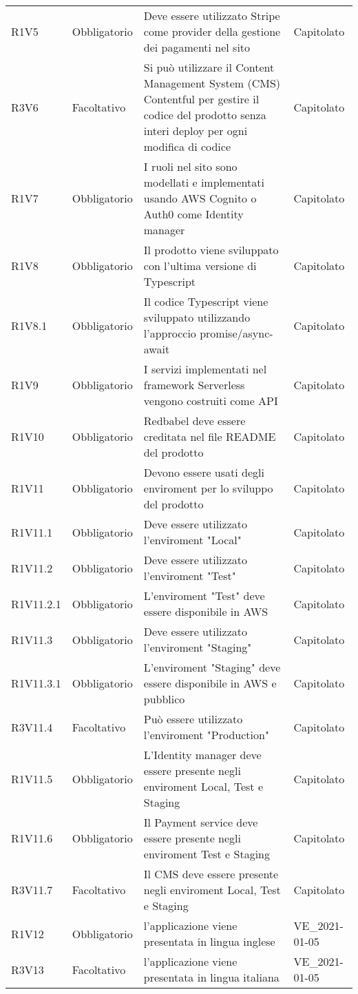 {\begin{longtable}{C{2.5cm} C{2.8cm} C{6.7cm} C{2.5cm}}
R1V5 & Obbligatorio & Deve essere utilizzato Stripe come provider della gestione dei pagamenti nel sito & Capitolato \\

R3V6 & Facoltativo & Si può utilizzare il Content Management System (CMS) Contentful per gestire il codice del prodotto senza interi deploy per ogni modifica di codice & Capitolato \\

R1V7 & Obbligatorio & I ruoli nel sito sono modellati e implementati usando AWS Cognito o Auth0 come Identity manager & Capitolato \\

R1V8 & Obbligatorio & Il prodotto viene sviluppato con l'ultima versione di Typescript & Capitolato \\
R1V8.1 & Obbligatorio & Il codice Typescript viene sviluppato utilizzando l'approccio promise/async-await & Capitolato \\

R1V9 & Obbligatorio & I servizi implementati nel framework Serverless vengono costruiti come API & Capitolato \\

R1V10 & Obbligatorio & Redbabel deve essere creditata nel file README del prodotto & Capitolato \\

R1V11 & Obbligatorio & Devono essere usati degli enviroment per lo sviluppo del prodotto & Capitolato \\
R1V11.1 & Obbligatorio & Deve essere utilizzato l'enviroment "Local" & Capitolato \\
R1V11.2 & Obbligatorio & Deve essere utilizzato l'enviroment "Test" & Capitolato \\
R1V11.2.1 & Obbligatorio & L'enviroment "Test" deve essere disponibile in AWS & Capitolato \\
R1V11.3 & Obbligatorio & Deve essere utilizzato l'enviroment "Staging" & Capitolato \\
R1V11.3.1 & Obbligatorio & L'enviroment "Staging" deve essere disponibile in AWS e pubblico & Capitolato \\
R3V11.4 & Facoltativo & Può essere utilizzato l'enviroment "Production" & Capitolato \\

R1V11.5 & Obbligatorio & L'Identity manager deve essere presente negli enviroment Local, Test e Staging & Capitolato \\
R1V11.6 & Obbligatorio & Il Payment service deve essere presente negli enviroment Test e Staging & Capitolato \\
R3V11.7 & Facoltativo & Il CMS deve essere presente negli enviroment Local, Test e Staging & Capitolato \\

R1V12 & Obbligatorio & l'applicazione viene presentata in lingua inglese & VE\_2021-01-05 \\
R3V13 & Facoltativo & l'applicazione viene presentata in lingua italiana & VE\_2021-01-05 \\

\end{longtable}

}